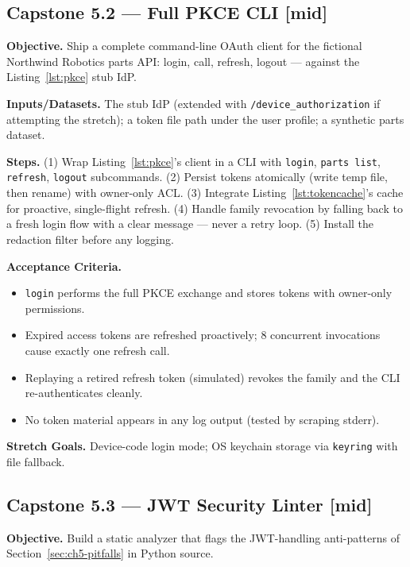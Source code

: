 \subsection*{Capstone 5.2 --- Full PKCE CLI \textbf{[mid]}}

\textbf{Objective.} Ship a complete command-line OAuth client for the
fictional Northwind Robotics parts API: login, call, refresh, logout ---
against the Listing~\ref{lst:pkce} stub IdP.

\textbf{Inputs/Datasets.} The stub IdP (extended with
\texttt{/device\_authorization} if attempting the stretch); a token file
path under the user profile; a synthetic parts dataset.

\textbf{Steps.} (1) Wrap Listing~\ref{lst:pkce}'s client in a CLI with
\texttt{login}, \texttt{parts list}, \texttt{refresh}, \texttt{logout}
subcommands. (2) Persist tokens atomically (write temp file, then rename)
with owner-only ACL. (3) Integrate Listing~\ref{lst:tokencache}'s cache for
proactive, single-flight refresh. (4) Handle family revocation by falling
back to a fresh login flow with a clear message --- never a retry loop.
(5) Install the redaction filter before any logging.

\textbf{Acceptance Criteria.}
\begin{itemize}
  \item[$\square$] \texttt{login} performs the full PKCE exchange and stores
        tokens with owner-only permissions.
  \item[$\square$] Expired access tokens are refreshed proactively; 8
        concurrent invocations cause exactly one refresh call.
  \item[$\square$] Replaying a retired refresh token (simulated) revokes the
        family and the CLI re-authenticates cleanly.
  \item[$\square$] No token material appears in any log output (tested by
        scraping stderr).
\end{itemize}

\textbf{Stretch Goals.} Device-code login mode; OS keychain storage via
\texttt{keyring} with file fallback.

\subsection*{Capstone 5.3 --- JWT Security Linter \textbf{[mid]}}

\textbf{Objective.} Build a static analyzer that flags the JWT-handling
anti-patterns of Section~\ref{sec:ch5-pitfalls} in Python source.

